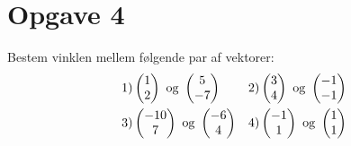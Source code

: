 \section*{Opgave 4}
Bestem vinklen mellem følgende par af vektorer:
\begin{align*}
&1) \begin{pmatrix}   
1 \\ 2
\end{pmatrix}  \textnormal{ og } \begin{pmatrix}
5\\-7
\end{pmatrix} &&2)  \begin{pmatrix}   
3 \\ 4
\end{pmatrix}  \textnormal{ og } \begin{pmatrix}
-1\\-1
\end{pmatrix}  \\
&3) \begin{pmatrix}   
-10 \\ 7
\end{pmatrix}  \textnormal{ og } \begin{pmatrix}
-6\\ 4
\end{pmatrix} &&4)  \begin{pmatrix}   
-1 \\ 1
\end{pmatrix}  \textnormal{ og } \begin{pmatrix}
1\\1
\end{pmatrix} 
\end{align*}
